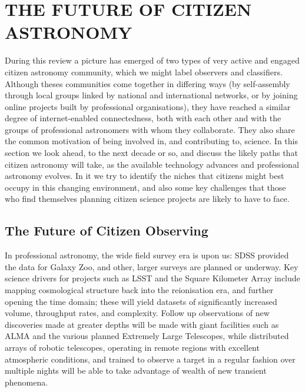 \documentclass{ar2e}
\begin{document}

\section{THE FUTURE OF CITIZEN ASTRONOMY}
\label{sec:future}


During this review a picture has emerged of two types of very active and engaged
citizen astronomy community, which we might label observers and classifiers. 
Although theses communities come together in differing ways (by self-assembly
through local groups linked by national and international networks, or by
joining online projects built by professional organisations), they have reached
a similar degree of internet-enabled connectedness, both with each other and
with the groups of professional astronomers with whom they  collaborate. They
also share the common motivation of being involved in, and contributing to,
science. In this section we look ahead, to the next decade or so, and discuss
the likely paths that citizen astronomy will take, as the available technology
advances and professional astronomy evolves. In it we try to identify the niches
that citizens might best occupy in this changing environment, and also some key
challenges that those who find themselves planning citizen science projects are
likely to have to face.



\subsection{The Future of Citizen Observing}

In professional astronomy, the wide field survey era is upon us: SDSS provided
the data for Galaxy Zoo, and other, larger surveys are planned or underway. Key
science drivers for projects such as LSST and the Square Kilometer Array include
mapping cosmological structure back into the reionisation era, and  further
opening the time domain; these will yield datasets of significantly increased
volume, throughput rates, and complexity.  Follow up observations of new
discoveries made at greater depths will be made with giant facilities such as
ALMA and the various planned Extremely Large Telescopes, while distributed
arrays of robotic telescopes, operating in remote regions with excellent
atmospheric conditions, and trained to observe a target in a regular fashion
over multiple nights will be able to take advantage of wealth of new transient
phenomena. 
\end{document}
